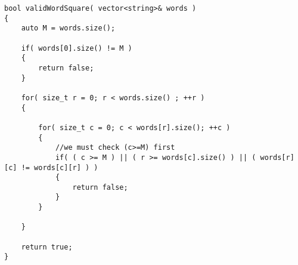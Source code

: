 \setcounter{lstlisting}{0}
\begin{lstlisting}[style=customc, caption={Matrix Compare}]
bool validWordSquare( vector<string>& words )
{
    auto M = words.size();

    if( words[0].size() != M )
    {
        return false;
    }

    for( size_t r = 0; r < words.size() ; ++r )
    {

        for( size_t c = 0; c < words[r].size(); ++c )
        {
            //we must check (c>=M) first
            if( ( c >= M ) || ( r >= words[c].size() ) || ( words[r][c] != words[c][r] ) )
            {
                return false;
            }
        }

    }

    return true;
}

\end{lstlisting}